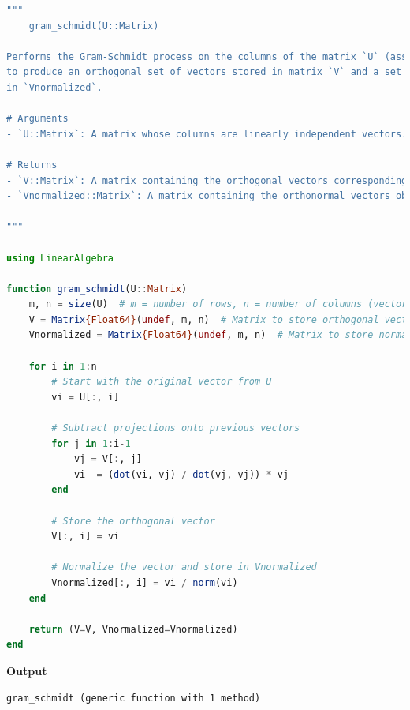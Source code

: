 \begin{lstlisting}[language=Julia,style=mystyle]
"""
    gram_schmidt(U::Matrix)

Performs the Gram-Schmidt process on the columns of the matrix `U` (assumed to be linearly independent) 
to produce an orthogonal set of vectors stored in matrix `V` and a set of orthonormal vectors stored 
in `Vnormalized`.

# Arguments
- `U::Matrix`: A matrix whose columns are linearly independent vectors.

# Returns
- `V::Matrix`: A matrix containing the orthogonal vectors corresponding to the columns of `U`.
- `Vnormalized::Matrix`: A matrix containing the orthonormal vectors obtained by normalizing the columns of `V`.

"""

using LinearAlgebra

function gram_schmidt(U::Matrix)
    m, n = size(U)  # m = number of rows, n = number of columns (vectors)
    V = Matrix{Float64}(undef, m, n)  # Matrix to store orthogonal vectors
    Vnormalized = Matrix{Float64}(undef, m, n)  # Matrix to store normalized orthogonal vectors
    
    for i in 1:n
        # Start with the original vector from U
        vi = U[:, i]
        
        # Subtract projections onto previous vectors
        for j in 1:i-1
            vj = V[:, j]
            vi -= (dot(vi, vj) / dot(vj, vj)) * vj
        end
        
        # Store the orthogonal vector
        V[:, i] = vi
        
        # Normalize the vector and store in Vnormalized
        Vnormalized[:, i] = vi / norm(vi)
    end
    
    return (V=V, Vnormalized=Vnormalized)
end
\end{lstlisting}
\textbf{Output} 
\begin{verbatim}
gram_schmidt (generic function with 1 method)
\end{verbatim}


